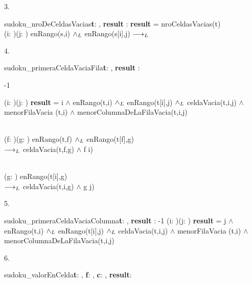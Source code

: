\documentclass[a4paper]{article}
\begin{document}
3. \begin{proc}{sudoku\_nroDeCeldasVacias}{\textbf{\In t}: \matriz{\ent}, \textbf{\Out result} : \ent }{}{}
    \post
		{
			\textbf{result} = nroCeldasVacias(t)
		}
			{\\
				(\forall i: \ent)(\forall j: \ent) enRango(s,i) $\land _L$ enRango(s[i],j) $\longrightarrow _L$ \\
				\sum {}
			}
		
	\end{proc}

4. \begin{proc}{sudoku\_primeraCeldaVaciaFila}{\textbf{\In t}: \matriz{\ent}, \textbf{\Out result} : \ent  }{}{}
    \post
		{
			{-1}
			{
				(\exists i: \ent)(\exists j: \ent) \textbf{result} = i $\land$ enRango(t,i) $\land _L$ enRango(t[i],j)        $\land _L$ celdaVacia(t,i,j) $\land$ menorFilaVacia (t,i) $\land$ menorColumnaDeLaFilaVacia(t,i,j)
				
				{\\
					(\forall f: \ent)(\forall g: \ent) enRango(t,f) $\land _L$ enRango(t[f],g)\\
					$\longrightarrow _L$ celdaVacia(t,f,g) $\land$ f \geq i)
				}
		
			{\\
				(\forall g: \ent) enRango(t[i],g)\\
				$\longrightarrow _L$ celdaVacia(t,i,g) $\land$ g \geq j)
			}
			}
		}
	\end{proc}

5. \begin{proc}{sudoku\_primeraCeldaVaciaColumna}{\textbf{\In t}: \matriz{\ent}, \textbf{\Out result} : \ent }{}{}
    \post
		{
			{-1}
			{
				(\exists i: \ent)(\exists j: \ent) \textbf{result} = j $\land$ enRango(t,i) $\land _L$ enRango(t[i],j)        $\land _L$ celdaVacia(t,i,j) $\land$ menorFilaVacia (t,i) $\land$ menorColumnaDeLaFilaVacia(t,i,j)
			}
		}
	\end{proc}

6. \begin{proc}{sudoku\_valorEnCelda}{\textbf{\In t}: \matriz{\ent}, \textbf{\In f}: \ent, \textbf{\In c}: \ent, \textbf{\Out result}: \bool}{}{}
	\end{proc}
\end{document}
